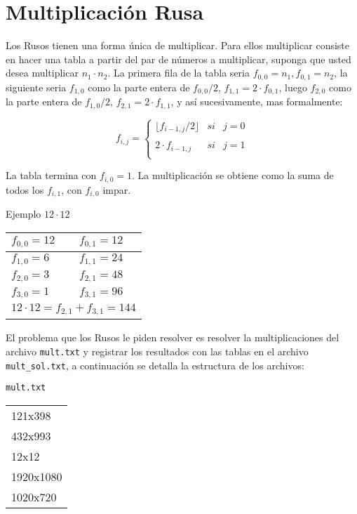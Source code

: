 \section{Multiplicación Rusa}

Los Rusos tienen una forma única de multiplicar. Para ellos multiplicar consiste en hacer una tabla a partir del par de números a multiplicar, suponga que usted desea multiplicar $n_1 \cdot n_2$. La primera fila de la tabla seria $f_{0,0} = n_1, f_{0,1} = n_2$, la siguiente seria $f_{1,0}$ como la parte entera de  $f_{0,0}/2$, $f_{1,1} = 2 \cdot f_{0,1}$, luego $f_{2,0}$ como la parte entera de  $f_{1,0}/2$, $f_{2,1} = 2 \cdot f_{1,1}$, y así sucesivamente, mas formalmente:

$$f_{i,j} = \left\{ \begin{array}{lcc}
             \lfloor f_{i-1,j}/2 \rfloor &   si  & j=0 \\
             \\ 2 \cdot f_{i-1,j} &  si & j=1 \\
             \end{array}
   \right.$$
   
La tabla termina con $f_{i,0} = 1$.
La multiplicación se obtiene como la suma de todos los $f_{i,1}$, con $f_{i,0}$ impar.

\begin{center}
    Ejemplo $12 \cdot 12$\\
    \begin{tabular}{|l|l|}
    \hline
    $f_{0,0} = 12$               & $f_{0,1} = 12$                \\ \hline
    $f_{1,0} = 6$                & $f_{1,1} = 24$                \\ \hline
    $f_{2,0} = 3$             & $f_{2,1} = 48$             \\ \hline
    $f_{3,0} = 1$             & $f_{3,1} = 96$             \\ \hline
    \multicolumn{2}{|l|}{$12 \cdot 12 = f_{2,1} + f_{3,1} =144$} \\ \hline
    \end{tabular}
    
\end{center}

El problema que los Rusos le piden resolver es resolver la multiplicaciones del archivo \texttt{mult.txt} y registrar los resultados con las tablas en el archivo \texttt{mult\_sol.txt}, a continuación se detalla la estructura de los archivos:

\begin{center}
    \texttt{mult.txt} \\
    \begin{tabular}{|l|}
        \hline
        121x398\\
        432x993\\
        12x12\\
        1920x1080\\
        1020x720\\
        \hline
    \end{tabular}
\end{center}


